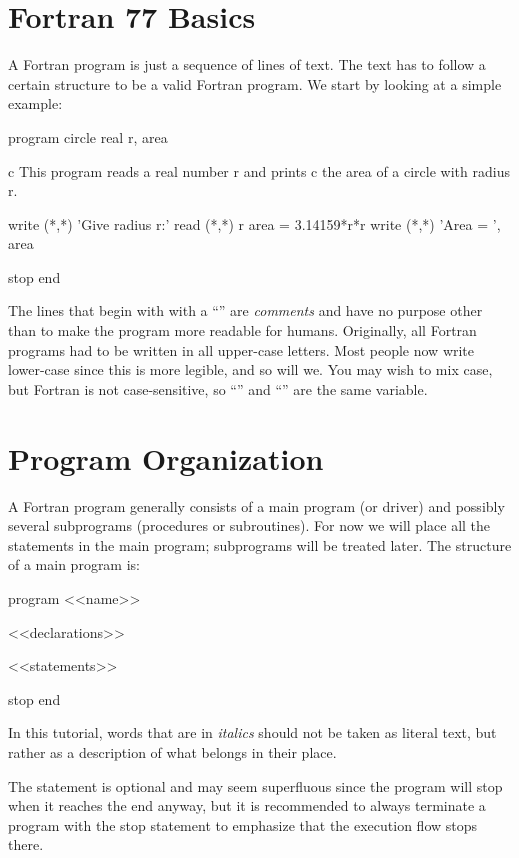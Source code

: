 \section{Fortran 77 Basics}

A Fortran program is just a sequence of lines of text. The text has to
follow a certain structure to be a valid Fortran program. We start by
looking at a simple example:

\begin{fortran77}
      program circle
      real r, area

c This program reads a real number r and prints
c the area of a circle with radius r.

      write (*,*) 'Give radius r:'
      read  (*,*) r
      area = 3.14159*r*r
      write (*,*) 'Area = ', area

      stop
      end
\end{fortran77}

The lines that begin with with a ``'' are
\textit{comments} and have no purpose other than to make the program
more readable for humans. Originally, all Fortran programs had to be
written in all upper-case letters. Most people now write lower-case
since this is more legible, and so will we. You may wish to mix case,
but Fortran is not case-sensitive, so ``'' and
``'' are the same variable.


\section*{Program Organization}

A Fortran program generally consists of a main program (or driver) and
possibly several subprograms (procedures or subroutines). For now we
will place all the statements in the main program; subprograms will be
treated later. The structure of a main program is:

\begin{fortran77}
      program <<name>>

      <<declarations>>

      <<statements>>

      stop
      end
\end{fortran77}

In this tutorial, words that are in \textit{italics} should not be taken
as literal text, but rather as a description of what belongs in their
place.

The  statement is optional and may seem
superfluous since the program will stop when it reaches the end anyway,
but it is recommended to always terminate a program with the stop
statement to emphasize that the execution flow stops there.

